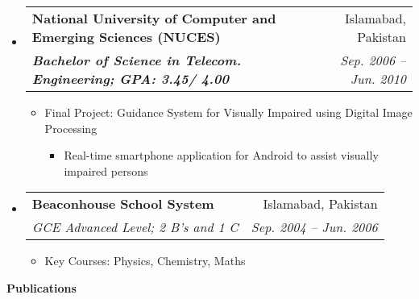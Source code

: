 \documentclass[letterpaper,11pt]{article}
\makeatletter
\newcommand{\resitem}[1]{\item #1 \vspace{-2pt}}
\newcommand{\resheading}[1]{{\large \colorbox{mygrey}{\begin{minipage}{\textwidth}{\textbf{#1 \vphantom{p\^{E}}}}\end{minipage}}}}
\newcommand{\ressubheading}[4]{
\begin{tabular*}{6.5in}{l@{\extracolsep{\fill}}r}
		\textbf{#1} & #2 \\
		\textit{#3} & \textit{#4} \\
\end{tabular*}\vspace{-6pt}}
\makeatother
\begin{document}
\begin{itemize}
\item
			\ressubheading{National University of Computer and Emerging Sciences (NUCES)}{Islamabad, Pakistan}{\textbf{Bachelor of Science in Telecom. Engineering; GPA: 3.45/ 4.00}}{Sep. 2006 -- Jun. 2010}
				{ \footnotesize
				\begin{itemize}

					\resitem{Final Project: Guidance System for Visually Impaired using Digital Image Processing} 
						\begin{itemize}
							\resitem{Real-time smartphone application for Android to assist visually impaired persons} 
						\end{itemize}
				\end{itemize}
				}

\item
			\ressubheading{Beaconhouse School System}{Islamabad, Pakistan}{GCE Advanced Level; 2 B's and 1 C}{Sep. 2004 -- Jun. 2006}
				{ \footnotesize
				\begin{itemize}
					\resitem{Key Courses: Physics, Chemistry, Maths}
					
				\end{itemize}
				}
	\end{itemize} 
\resheading{Publications}
\end{document}

